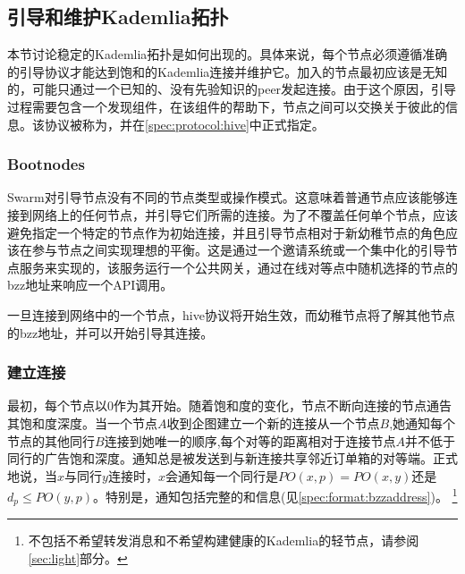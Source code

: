 \subsection{引导和维护Kademlia拓扑\statusgreen}\label{sec:bootstrapping}
 
 
本节讨论稳定的Kademlia拓扑是如何出现的。具体来说，每个节点必须遵循准确的引导协议才能达到饱和的Kademlia连接并维护它。加入的节点最初应该是无知的，可能只通过一个已知的、没有先验知识的peer发起连接。由于这个原因，引导过程需要包含一个发现组件，在该组件的帮助下，节点之间可以交换关于彼此的信息。该协议被称为，并在\ref{spec:protocol:hive}中正式指定。

\subsubsection{Bootnodes}

Swarm对引导节点没有不同的节点类型或操作模式。这意味着普通节点应该能够连接到网络上的任何节点，并引导它们所需的连接。为了不覆盖任何单个节点，应该避免指定一个特定的节点作为初始连接，并且引导节点相对于新幼稚节点的角色应该在参与节点之间实现理想的平衡。这是通过一个邀请系统或一个集中化的引导节点服务来实现的，该服务运行一个公共网关，通过在线对等点中随机选择的节点的bzz地址来响应一个API调用。 

一旦连接到网络中的一个节点，hive协议将开始生效，而幼稚节点将了解其他节点的bzz地址，并可以开始引导其连接。

\subsubsection{建立连接}

最初，每个节点以0作为其开始。随着饱和度的变化，节点不断向连接的节点通告其饱和度深度。当一个节点$A$收到企图建立一个新的连接从一个节点$B$,她通知每个节点的其他同行$B$连接到她唯一的顺序,每个对等的距离相对于连接节点$A$并不低于同行的广告饱和深度。通知总是被发送到与新连接共享邻近订单箱的对等端。正式地说，当$x$与同行$y$连接时，$x$会通知每一个同行是$\mathit{PO}(x, p) = \mathit{PO}(x, y)$还是$d_p\leq \mathit{PO}(y, p)$。特别是，通知包括完整的和信息(见\ref{spec:format:bzzaddress})。%
%
\footnote{不包括不希望转发消息和不希望构建健康的Kademlia的轻节点，请参阅\ref{sec:light}部分。 }

    



